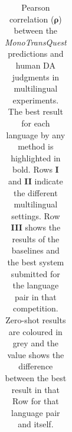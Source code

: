 \begin{table}[t]
\begin{center}
\begin{tabular}{l l  c c c c c c c}
			\bottomrule
		\end{tabular}
	\end{center}
	\caption[Pearson correlation between the MonoTransQuest predictions and human DA judgments in multilingual experiments]{Pearson correlation ($\bm{\rho}$) between the \textit{MonoTransQuest} predictions and human DA judgments in multilingual experiments. The best result for each language by any method is highlighted in bold. Rows \textbf{I} and \textbf{II} indicate the different multilingual settings. Row \textbf{III} shows the results of the baselines and the best system submitted for the language pair in that competition. Zero-shot results are coloured in grey and the value shows the difference between the best result in that Row for that language pair and itself. }
	\label{tab:multilingual_direct_assesement}
\end{table}


